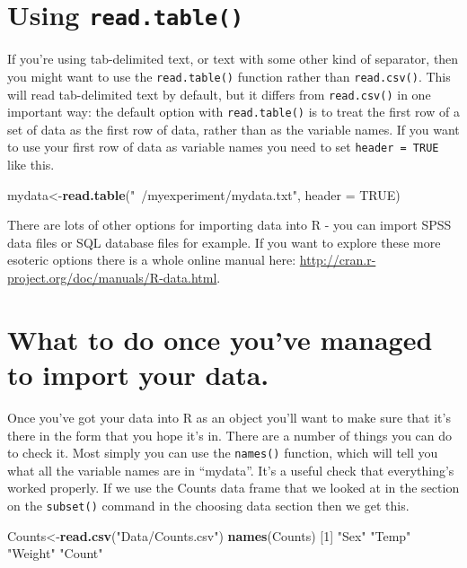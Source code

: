 \documentclass[
]{book}
\newenvironment{Shaded}{\begin{snugshade}}{\end{snugshade}}
\newcommand{\DataTypeTok}[1]{\textcolor[rgb]{0.13,0.29,0.53}{#1}}
\newcommand{\DecValTok}[1]{\textcolor[rgb]{0.00,0.00,0.81}{#1}}
\newcommand{\KeywordTok}[1]{\textcolor[rgb]{0.13,0.29,0.53}{\textbf{#1}}}
\newcommand{\NormalTok}[1]{#1}
\newcommand{\OtherTok}[1]{\textcolor[rgb]{0.56,0.35,0.01}{#1}}
\newcommand{\StringTok}[1]{\textcolor[rgb]{0.31,0.60,0.02}{#1}}
\begin{document}
\hypertarget{using-read.table}{%
\section{\texorpdfstring{Using \texttt{read.table()}}{Using read.table()}}\label{using-read.table}}

If you're using tab-delimited text, or text with some other kind of separator, then you might want to use the \texttt{read.table()} function rather than \texttt{read.csv()}. This will read tab-delimited text by default, but it differs from \texttt{read.csv()} in one important way: the default option with \texttt{read.table()} is to treat the first row of a set of data as the first row of data, rather than as the variable names. If you want to use your first row of data as variable names you need to set \texttt{header\ =\ TRUE} like this.

\begin{Shaded}
\begin{Highlighting}[]
\NormalTok{mydata<-}\KeywordTok{read.table}\NormalTok{(}\StringTok{"~/myexperiment/mydata.txt"}\NormalTok{, }\DataTypeTok{header =} \OtherTok{TRUE}\NormalTok{)}
\end{Highlighting}
\end{Shaded}

There are lots of other options for importing data into R - you can import SPSS data files or SQL database files for example. If you want to explore these more esoteric options there is a whole online manual here: \url{http://cran.r-project.org/doc/manuals/R-data.html}.

\hypertarget{what-to-do-once-youve-managed-to-import-your-data.}{%
\section{What to do once you've managed to import your data.}\label{what-to-do-once-youve-managed-to-import-your-data.}}

Once you've got your data into R as an object you'll want to make sure that it's there in the form that you hope it's in. There are a number of things you can do to check it. Most simply you can use the \texttt{names()} function, which will tell you what all the variable names are in ``mydata''. It's a useful check that everything's worked properly. If we use the Counts data frame that we looked at in the section on the \texttt{subset()} command in the choosing data section then we get this.

\begin{Shaded}
\begin{Highlighting}[]
\NormalTok{Counts<-}\KeywordTok{read.csv}\NormalTok{(}\StringTok{"Data/Counts.csv"}\NormalTok{)}
\KeywordTok{names}\NormalTok{(Counts)}
\NormalTok{[}\DecValTok{1}\NormalTok{] }\StringTok{"Sex"}    \StringTok{"Temp"}   \StringTok{"Weight"} \StringTok{"Count"} 
\end{Highlighting}
\end{Shaded}
\end{document}
